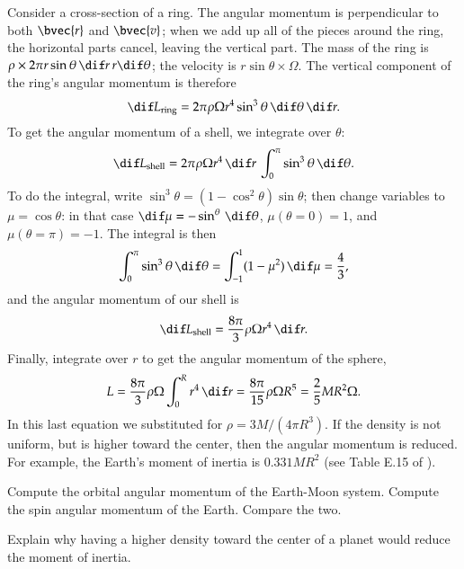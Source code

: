 Consider a cross-section of a ring.  The angular momentum is perpendicular to both $\bvec{r}$ and $\bvec{v}$; when we add up all of the pieces around the ring, the horizontal parts cancel, leaving the vertical part.  The mass of the ring is $\rho\times 2\pi r\sin\theta\,\dif r\,r\dif\theta$; the velocity is $r\sin\theta \times \Omega$.  The vertical component of the ring's angular momentum is therefore
\[
	\dif L_{\mathrm{ring}} = 2\pi \rho\Omega r^{4}\sin^{3}\theta\, \dif \theta \,\dif r.
\]
To get the angular momentum of a shell, we integrate over $\theta$:
\[
	\dif L_{\mathrm{shell}} = 2\pi\rho\Omega r^{4}\,\dif r\,\int_{0}^{\pi}\sin^{3}\theta\,\dif\theta.
\]
To do the integral, write $\sin^{3}\theta = (1-\cos^{2}\theta)\sin\theta$; then change variables to $\mu = \cos \theta$: in that case $\dif\mu = -\sin^\theta\,\dif\theta$, $\mu(\theta = 0) = 1$, and $\mu(\theta=\pi)=-1$.  The integral is then
\[
	\int_{0}^{\pi}\sin^{3}\theta\,\dif\theta = \int_{-1}^{1}(1-\mu^{2})\,\dif\mu 
		= \frac{4}{3},
\]
and the angular momentum of our shell is
\[
	\dif L_{\mathrm{shell}} = \frac{8\pi}{3}\rho\Omega r^{4}\,\dif r.
\]
Finally, integrate over $r$ to get the angular momentum of the sphere,
\begin{equation}\label{e.ang-momentum-sphere}
	L = \frac{8\pi}{3}\rho\Omega \int_{0}^{R}r^{4}\,\dif r = \frac{8\pi}{15}\rho\Omega R^{5} = \frac{2}{5} MR^{2}\Omega.
\end{equation}
In this last equation we substituted for $\rho = 3M/(4\pi R^{3})$. If the density is not uniform, but is higher toward the center, then the angular momentum is reduced. For example, the Earth's moment of inertia is $0.331 MR^{2}$ (see Table E.15 of ).

\begin{exercisebox}
Compute the orbital angular momentum of the Earth-Moon system.  Compute the spin angular momentum of the Earth. Compare the two.
\end{exercisebox}

\begin{exercisebox}
Explain why having a higher density toward the center of a planet would reduce the moment of inertia.
\end{exercisebox}
